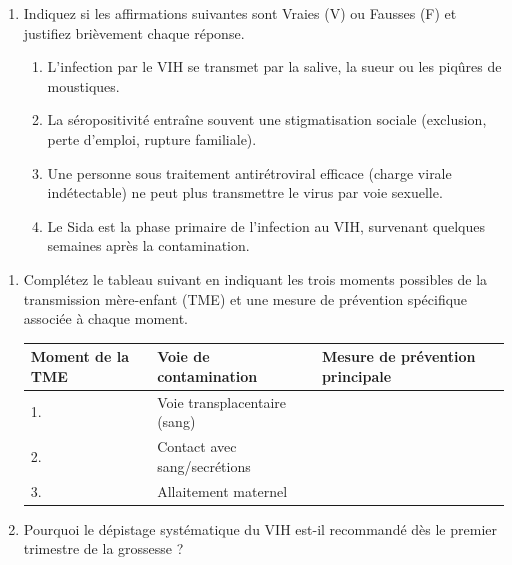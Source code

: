 \documentclass[11pt]{article}
\begin{document}
\begin{exercice}
\begin{enumerate}
    \item Indiquez si les affirmations suivantes sont Vraies (V) ou Fausses (F) et justifiez brièvement chaque réponse.
    \begin{enumerate}
        \item L'infection par le VIH se transmet par la salive, la sueur ou les piqûres de moustiques.
        \item La séropositivité entraîne souvent une stigmatisation sociale (exclusion, perte d'emploi, rupture familiale).
        \item Une personne sous traitement antirétroviral efficace (charge virale indétectable) ne peut plus transmettre le virus par voie sexuelle.
        \item Le Sida est la phase primaire de l'infection au VIH, survenant quelques semaines après la contamination.
    \end{enumerate}
\end{enumerate}
\end{exercice}

\begin{exercice}
\begin{enumerate}
    \item Complétez le tableau suivant en indiquant les trois moments possibles de la transmission mère-enfant (TME) et une mesure de prévention spécifique associée à chaque moment.
    \begin{tabular}{|p{3.5cm}|p{5cm}|p{5cm}|}
    \hline
    \textbf{Moment de la TME} & \textbf{Voie de contamination} & \textbf{Mesure de prévention principale} \\
    \hline
    1. \underline{\hspace{3cm}} & Voie transplacentaire (sang) & \underline{\hspace{4.5cm}} \\
    \hline
    2. \underline{\hspace{3cm}} & Contact avec sang/secrétions & \underline{\hspace{4.5cm}} \\
    \hline
    3. \underline{\hspace{3cm}} & Allaitement maternel & \underline{\hspace{4.5cm}} \\
    \hline
    \end{tabular}
    \item Pourquoi le dépistage systématique du VIH est-il recommandé dès le premier trimestre de la grossesse ?
\end{enumerate}
\end{exercice}
\end{document}
